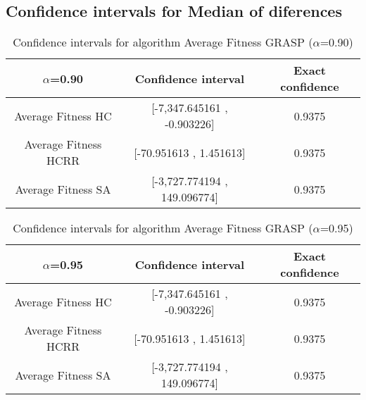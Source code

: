 \documentclass[a4paper,10pt]{article}
\begin{document}
\subsection{Confidence intervals for Median of diferences}

\begin{table}[!htp]
\centering\small
\begin{tabular}{
|c|c|c|}
\hline
 $\alpha$=0.90 & Confidence interval & Exact confidence \\ \hline 
Average Fitness HC & [-7,347.645161 , -0.903226] & 0.9375\\ \hline 
Average Fitness HCRR & [-70.951613 , 1.451613] & 0.9375\\ \hline 
Average Fitness SA & [-3,727.774194 , 149.096774] & 0.9375\\ \hline 

\end{tabular}
\caption{Confidence intervals for algorithm Average Fitness GRASP ($\alpha$=0.90)}
\end{table}
\begin{table}[!htp]
\centering\small
\begin{tabular}{
|c|c|c|}
\hline
 $\alpha$=0.95 & Confidence interval & Exact confidence \\ \hline 
Average Fitness HC & [-7,347.645161 , -0.903226] & 0.9375\\ \hline 
Average Fitness HCRR & [-70.951613 , 1.451613] & 0.9375\\ \hline 
Average Fitness SA & [-3,727.774194 , 149.096774] & 0.9375\\ \hline 

\end{tabular}
\caption{Confidence intervals for algorithm Average Fitness GRASP ($\alpha$=0.95)}
\end{table}

 \clearpage 
\end{document}
